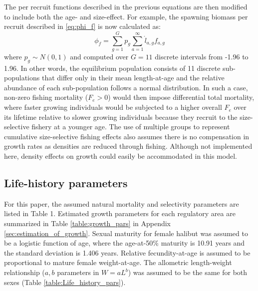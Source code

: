 The per recruit functions described in the previous equations are then modified to include both the age- and size-effect.  For example, the spawning biomass per recruit described in \eqref{eq:phi_f} is now calculated as:
\begin{equation}
	\phi_{f} =\sum_{g=1}^G p_g \sum_{a=1}^\infty \acute{l}_{a,g} f_{a,g}\label{eq:phi_fg}
\end{equation}
where $p_g \sim N(0,1)$ and computed over $G=11$ discrete intervals from -1.96 to 1.96.  In other words, the equilibrium population consists of 11 discrete sub-populations that differ only in their mean length-at-age and the relative abundance of each sub-population follows a normal distribution.  In such a case, non-zero fishing mortality  ($F_e>0$) would then impose differential total mortality, where faster growing individuals would be subjected to a higher overall $F_e$ over its lifetime relative to slower growing individuals because they recruit to the size-selective fishery at a younger age.  The use of multiple groups to represent cumulative size-selective fishing effects also assumes  there is no compensation in growth rates as densities are reduced through fishing. Although not implemented here, density effects on growth could easily be accommodated in this model.

\subsection*{Life-history parameters}%
\label{sub:life_history_parameters_and_price_information}
For this paper, the assumed natural mortality  and selectivity parameters are listed in Table 1.  Estimated growth parameters for each regulatory area are summarized in Table \ref{table:growth_pars} in Appendix \ref{sec:estimation_of_growth}.  Sexual maturity for female halibut was assumed to be a logistic function of age, where the age-at-50\% maturity is 10.91 years and the standard deviation is 1.406 years.  Relative fecundity-at-age is assumed to be proportional to mature female weight-at-age.  The allometric length-weight relationship ($a,b$ parameters in $W = a L ^b$) was assumed to be the same for both sexes (Table \ref{table:Life_history_pars}).

